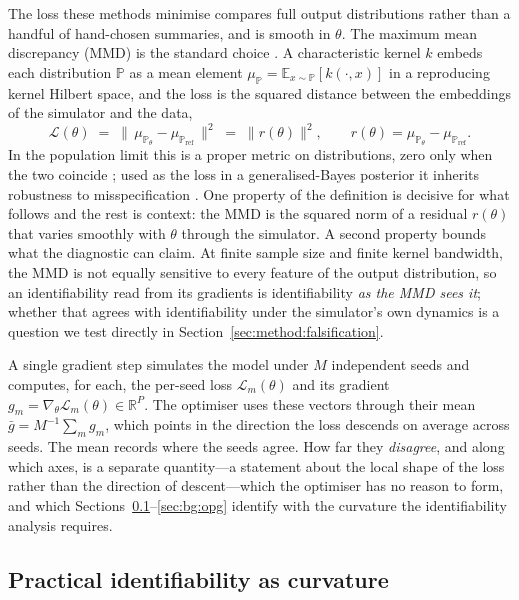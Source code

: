 \documentclass[10pt,twocolumn]{article}
\newcommand{\R}{\mathbb{R}}
\newcommand{\E}{\mathbb{E}}
\newcommand{\Prob}{\mathbb{P}}
\newcommand{\Ltot}{\mathcal{L}}
\newcommand{\muref}{\mu_{\Prob_{\mathrm{ref}}}}
\newcommand{\mutheta}{\mu_{\Prob_\theta}}
\begin{document}
The loss these methods minimise compares full output distributions rather than a
handful of hand-chosen summaries, and is smooth in $\theta$. The maximum mean
discrepancy (MMD) is the standard choice \citep{gretton2012kernel, dyer2024black}.
A characteristic kernel $k$ embeds each distribution $\Prob$ as a mean element
$\mu_\Prob = \E_{x\sim\Prob}[k(\cdot,x)]$ in a reproducing kernel Hilbert space, and
the loss is the squared distance between the embeddings of the simulator and the
data,
\begin{equation}
  \Ltot(\theta) \;=\; \big\|\, \mutheta - \muref \,\big\|^2
                \;=\; \|r(\theta)\|^2,
  \qquad r(\theta) = \mutheta - \muref .
  \label{eq:mmd}
\end{equation}
In the population limit this is a proper metric on distributions, zero only when the
two coincide \citep{sriperumbudur2010hilbert}; used as the loss in a
generalised-Bayes posterior it inherits robustness to misspecification
\citep{cherief2020mmd, knoblauch2022optimization}. One property of the definition is
decisive for what follows and the rest is context: the MMD is the squared norm of a
residual $r(\theta)$ that varies smoothly with $\theta$ through the simulator. A
second property bounds what the diagnostic can claim. At finite sample size and
finite kernel bandwidth, the MMD is not equally sensitive to every feature of the
output distribution, so an identifiability read from its gradients is
identifiability \emph{as the MMD sees it}; whether that agrees with identifiability
under the simulator's own dynamics is a question we test directly in
Section~\ref{sec:method:falsification}.

A single gradient step simulates the model under $M$ independent seeds and computes,
for each, the per-seed loss $\Ltot_m(\theta)$ and its gradient
$g_m = \nabla_\theta \Ltot_m(\theta) \in \R^P$. The optimiser uses these vectors
through their mean $\bar g = M^{-1}\sum_m g_m$, which points in the direction the
loss descends on average across seeds. The mean records where the seeds agree. How
far they \emph{disagree}, and along which axes, is a separate quantity---a statement
about the local shape of the loss rather than the direction of descent---which the
optimiser has no reason to form, and which
Sections~\ref{sec:bg:identifiability}--\ref{sec:bg:opg} identify with the curvature
the identifiability analysis requires.

\subsection{Practical identifiability as curvature}
\label{sec:bg:identifiability}
\end{document}
